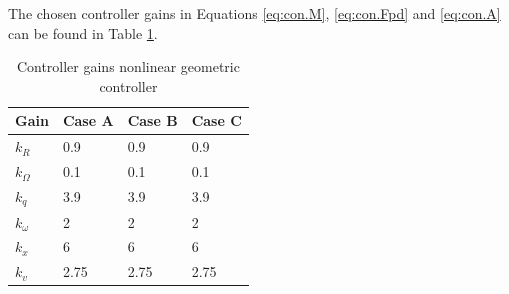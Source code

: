 The chosen controller gains in Equations \ref{eq:con.M}, \ref{eq:con.Fpd} and \ref{eq:con.A} can be found in Table \ref{tab:set.gains}.
\begin{table}[h!]
	\centering
	\begin{tabular}{|l|l|l|l|}
		\hline
		\textbf{Gain}&\textbf{Case A}&\textbf{Case B}&\textbf{Case C}\\
		\hline
		$	k_R	$	&	0.9	&	0.9	&	0.9	\\
		$	k_\Omega	$	&	0.1	&	0.1	&	0.1	\\
		$	k_q	$	&	3.9	&	3.9	&	3.9	\\
		$	k_\omega	$	&	2	&	2	&	2	\\
		$	k_x	$	&	6	&	6	&	6	\\
		$	k_v	$	&	2.75	&	2.75	&	2.75	\\
		\hline
	\end{tabular}
	\caption{Controller gains nonlinear geometric controller}
	\label{tab:set.gains}
\end{table}
\clearpage

